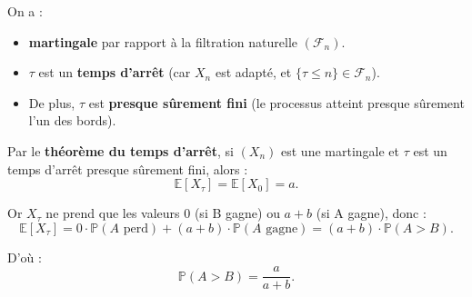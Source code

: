\vspace{0.5cm}

On a :
\begin{itemize}
    \item  \textbf{martingale} par rapport à la filtration naturelle $(\mathcal{F}_n)$.
    
    \item  $\tau$ est un \textbf{temps d'arrêt} (car $X_n$ est adapté, et $\{ \tau \leq n \} \in \mathcal{F}_n$).
    
    \item De plus, $\tau$ est \textbf{presque sûrement fini} (le processus atteint presque sûrement l’un des bords).

\end{itemize}


Par le \textbf{théorème du temps d'arrêt}, si $(X_n)$ est une martingale et $\tau$ est un temps d'arrêt presque sûrement fini, alors :
\[
\mathbb{E}[X_\tau] = \mathbb{E}[X_0] = a.
\]


Or $X_\tau$ ne prend que les valeurs $0$ (si B gagne) ou $a + b$ (si A gagne), donc :
\[
\mathbb{E}[X_\tau] = 0 \cdot \mathbb{P}(A \text{ perd}) + (a + b) \cdot \mathbb{P}(A \text{ gagne}) = (a + b) \cdot \mathbb{P}(A > B).
\]

D’où :
\[
\boxed{\mathbb{P}(A > B) = \frac{a}{a + b}}.
\]






